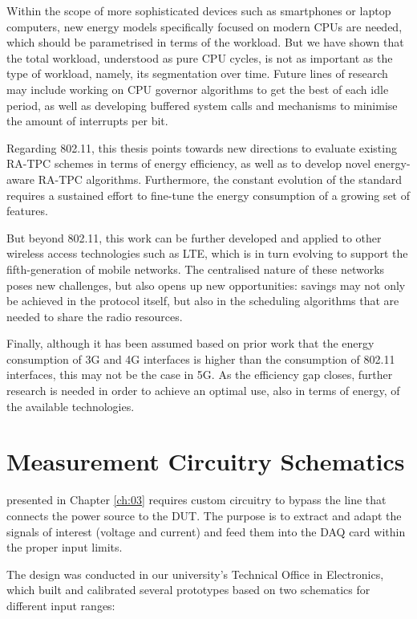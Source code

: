 \documentclass[twoside,nohyper]{tufte-book}
\theoremstyle{definition}
\theoremstyle{definition}
\theoremstyle{definition}
\theoremstyle{remark}
\begin{document}
Within the scope of more sophisticated devices such as smartphones or
laptop computers, new energy models specifically focused on modern CPUs
are needed, which should be parametrised in terms of the workload. But
we have shown that the total workload, understood as pure CPU cycles, is
not as important as the type of workload, namely, its segmentation over
time. Future lines of research may include working on CPU governor
algorithms to get the best of each idle period, as well as developing
buffered system calls and mechanisms to minimise the amount of
interrupts per bit.

Regarding 802.11, this thesis points towards new directions to evaluate
existing RA-TPC schemes in terms of energy efficiency, as well as to
develop novel energy-aware RA-TPC algorithms. Furthermore, the constant
evolution of the standard requires a sustained effort to fine-tune the
energy consumption of a growing set of features.

But beyond 802.11, this work can be further developed and applied to
other wireless access technologies such as LTE, which is in turn
evolving to support the fifth-generation of mobile networks. The
centralised nature of these networks poses new challenges, but also
opens up new opportunities: savings may not only be achieved in the
protocol itself, but also in the scheduling algorithms that are needed
to share the radio resources.

Finally, although it has been assumed based on prior work that the
energy consumption of 3G and 4G interfaces is higher than the
consumption of 802.11 interfaces, this may not be the case in 5G. As the
efficiency gap closes, further research is needed in order to achieve an
optimal use, also in terms of energy, of the available technologies.

\appendix


\chapter{Measurement Circuitry
Schematics}\label{measurement-circuitry-schematics}

 presented in Chapter
\ref{ch:03} requires custom circuitry to bypass the line that connects
the power source to the DUT. The purpose is to extract and adapt the
signals of interest (voltage and current) and feed them into the DAQ
card within the proper input limits.

The design was conducted in our university's Technical Office in
Electronics, which built and calibrated several prototypes based on two
schematics for different input ranges:
\end{document}

